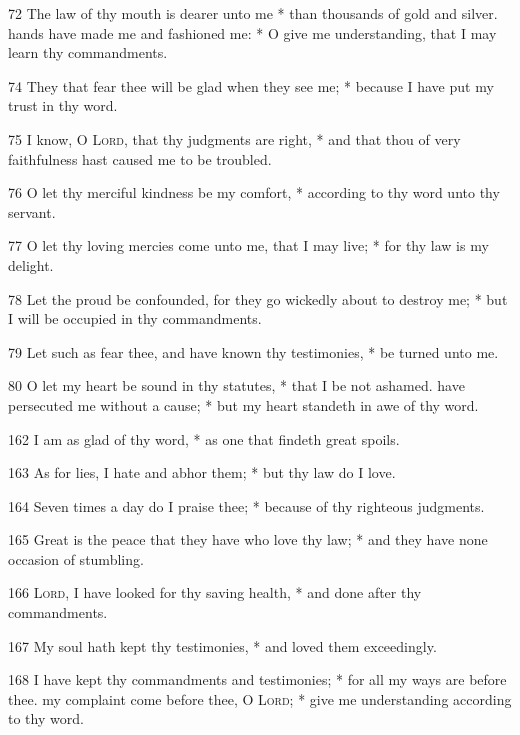 \par
    72 The law of thy mouth is dearer unto me * than thousands of gold and silver.
 hands have made me and fashioned me: * O give me understanding, that I may learn thy commandments.
\par
    74 They that fear thee will be glad when they see me; * because I have put my trust in thy word.
\par
    75 I know, O \textsc{Lord}, that thy judgments are right, * and that thou of very faithfulness hast caused me to be troubled.
\par
    76 O let thy merciful kindness be my comfort, * according to thy word unto thy servant.
\par
    77 O let thy loving mercies come unto me, that I may live; * for thy law is my delight.
\par
    78 Let the proud be confounded, for they go wickedly about to destroy me; * but I will be occupied in thy commandments.
\par
    79 Let such as fear thee, and have known thy testimonies, * be turned unto me.
\par
    80 O let my heart be sound in thy statutes, * that I be not ashamed.
 have persecuted me without a cause; * but my heart standeth in awe of thy word.
\par
    162 I am as glad of thy word, * as one that findeth great spoils.
\par
    163 As for lies, I hate and abhor them; * but thy law do I love.
\par
    164 Seven times a day do I praise thee; * because of thy righteous judgments.
\par
    165 Great is the peace that they have who love thy law; * and they have none occasion of stumbling.
\par
    166 \textsc{Lord}, I have looked for thy saving health, * and done after thy commandments.
\par
    167 My soul hath kept thy testimonies, * and loved them exceedingly.
\par
    168 I have kept thy commandments and testimonies; * for all my ways are before thee.
 my complaint come before thee, O \textsc{Lord}; * give me understanding according to thy word.
